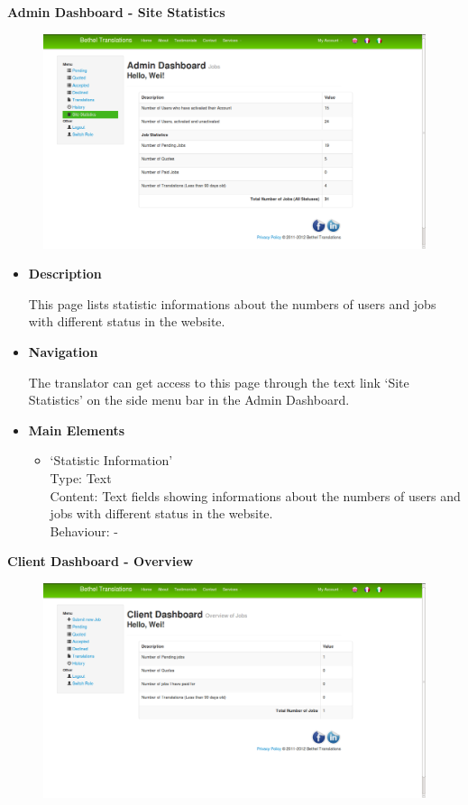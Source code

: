 \documentclass{l3proj}
\begin{document}
\textbf{Admin Dashboard - Site Statistics}
\begin{figure}[H]
\centering
\includegraphics[width=0.8\linewidth]{images/adminDashStatistics}
\vspace{-30pt}
\end{figure}

\begin{itemize}
\item \textbf{Description}

This page lists statistic informations about the numbers of users and jobs with different status in the website.\\

\item \textbf{Navigation}

The translator can get access to this page through the text link `Site Statistics' on the side menu bar in the Admin Dashboard.

\item \textbf{Main Elements}
\begin{itemize}

\item `Statistic Information'\\
Type: Text\\
Content: Text fields showing informations about the numbers of users and jobs with different status in the website.\\
Behaviour: - \\

\end{itemize}
\end{itemize}

\textbf{Client Dashboard - Overview}
\begin{figure}[H]
\centering
\includegraphics[width=0.8\linewidth]{images/clientDashOverview}
\vspace{-30pt}
\end{figure}
\end{document}

